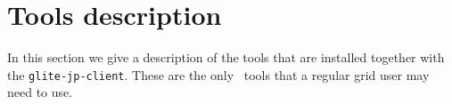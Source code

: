 \section{Tools description}

In this section we give a description of the tools that are installed
together with the \verb'glite-jp-client'. These are the only \JP\ tools that a
regular grid user may need to use.


{
\parindent0pt
\def\section#1{\subsection{#1}}
\newcommand{\dbz}{}
\newcommand{\docbooktolatexpipe}{\ensuremath{|}}
\newskip\docbooktolatexoldparskip

}






